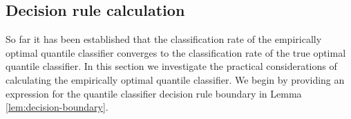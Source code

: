 



\subsection{Decision rule calculation}
\label{sec:empirical-quantile-classifier-results}

So far it has been established that the classification rate of the empirically
optimal quantile classifier converges to the classification rate of the true
optimal quantile classifier.  In this section we investigate the practical
considerations of calculating the empirically optimal quantile classifier.  We
begin by providing an expression for the quantile classifier decision rule
boundary in Lemma \ref{lem:decision-boundary}.

